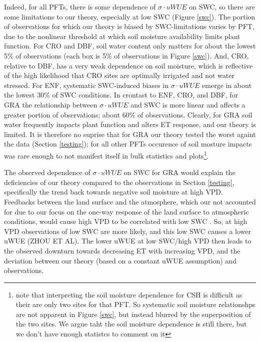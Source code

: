\documentclass[draft,linenumbers]{agujournal}
\begin{document}
Indeed, for all PFTs, there is some dependence of $\sigma \cdot uWUE$ on SWC, so there are some limitations to our theory, especially at low SWC (Figure \ref{swc}). The portion of observations for which our theory is biased by SWC-limitations varies by PFT, due to the nonlinear threshold at which soil moisture availability limits plant function. For CRO and DBF, soil water content only matters for about the lowest 5\% of observations (each box is 5\% of observations in Figure \ref{swc}). And, CRO, relative to DBF, has a very weak dependence on soil moisture, which is reflective of the high likelihood that CRO sites are optimally irrigated and not water stressed. For ENF, systematic SWC-induced biases in $\sigma \cdot uWUE$ emerge in about the lowest 30\% of SWC conditions. In crontast to ENF, CRO, and DBF, for GRA the relationship between $\sigma \cdot uWUE$ and SWC is more linear and affects a greater portion of observations; about 60\% of observations. Clearly, for GRA soil water frequently impacts plant function and alters ET response, and our theory is limited. It is therefore no suprise that for GRA our theory tested the worst againt the data (Section \ref{testing}); for all other PFTs occurence of soil mosture impacts was rare enough to not manifest itself in bulk statistics and plots\footnote{note that interpreting the soil moisture dependence for CSH is difficult as their are only two sites for that PFT. So systematic soil moisture relationshps are not apparent in Figure \ref{swc}, but instead blurred by the superposition of the two sites. We argue taht the soil moisture dependence is still there, but we don't have enough statistcs to comment on it}.

The observed dependence of $\sigma \cdot uWUE$ on SWC for GRA would explain the deficiencies of our theory compared to the observations in Section \ref{testing}, specifically the trend back towards negative soil moisture at high VPD. Feedbacks between the land surface and the atmosphere, which our not accounted for due to our focus on the one-way response of the land surface to atmospheric conditions, would cause high VPD to be correlated with low SWC \citep[][Gentine et al. GRL 2016]{Berg_2016}. So, at high VPD observations of low SWC are more likely, and this low SWC causes a lower uWUE (ZHOU ET AL). The lower uWUE at low SWC/high VPD then leads to the observed downturn towards decreasing ET with increasing VPD, and the deviation between our theory (based on a constant uWUE assumption) and observations.
\end{document}
